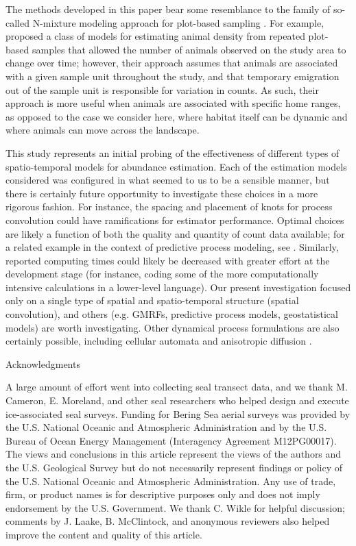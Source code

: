 \documentclass[12pt,english]{article}
\begin{document}
\begin{spacing}{1.9}
The methods developed in this paper bear some resemblance to the family of so-called N-mixture modeling approach for plot-based sampling \citep{Royle2004}.  For example, \citet{ChandlerEtAl2011} proposed a class of models for estimating animal density from repeated plot-based samples that allowed the number of animals observed on the study area to change over time; however, their approach assumes that animals are associated with a given sample unit throughout the study, and that temporary emigration out of the sample unit is responsible for variation in counts.  As such, their approach is more useful when animals are associated with specific home ranges, as opposed to the case we consider here, where habitat itself can be dynamic and where animals can move across the landscape.

This study represents an initial probing of the effectiveness of different types of spatio-temporal models for abundance estimation.  Each of the estimation models considered was configured in what seemed to us to be a sensible manner, but there is certainly future opportunity to investigate these choices in a more rigorous fashion.  For instance, the spacing and placement of knots for process convolution could have ramifications for estimator performance. Optimal choices are likely a function of both the quality and quantity of count data available; for a related example in the context of predictive process modeling, see \citet{FinleyEtAl2009}.  Similarly, reported computing times could likely be decreased with greater effort at the development stage (for instance, coding some of the more computationally intensive calculations in a lower-level language).  Our present investigation focused only on a single type of spatial and spatio-temporal structure (spatial convolution), and others (e.g. GMRFs, predictive process models, geostatistical models) are worth investigating.  Other dynamical process formulations are also certainly possible, including cellular automata \citep{HootenWikle2010} and anisotropic diffusion \citep{WikleEtAl2001}.


\centerline{\sc Acknowledgments} A large amount of effort went into collecting seal transect data, and we thank M. Cameron, E. Moreland, and other seal researchers who helped design and execute ice-associated seal surveys.  Funding
for Bering Sea aerial surveys was provided by the U.S. National Oceanic and Atmospheric
Administration and by the U.S. Bureau of Ocean Energy Management (Interagency
Agreement M12PG00017).  The views and conclusions in this article represent the views of the authors and the U.S. Geological Survey but do not necessarily represent findings or policy of the U.S. National Oceanic and Atmospheric Administration.  Any use of trade, firm, or product names is for descriptive purposes only and does not imply endorsement by the U.S. Government.  We thank C. Wikle for helpful discussion; comments by J. Laake, B. McClintock, and anonymous reviewers also helped improve the content and quality of this article.


\end{spacing}
\end{document}
